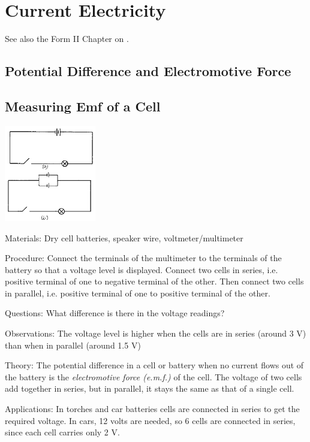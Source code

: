 \section{Current Electricity}
See also the Form II Chapter on .

\begin{multicols}{2}


\section*{Potential Difference and Electromotive Force}


\subsection{Measuring Emf of a Cell}

\begin{center}
\includegraphics[width=0.3\textwidth]{./img/source/measuring-emf.png}
\end{center}

\begin{description*}
\item[Materials:]{Dry cell batteries, speaker wire, voltmeter/multimeter}
\item[Procedure:]{Connect the terminals of the multimeter to the terminals of the battery so that a voltage level is displayed. Connect two cells in series, i.e. positive terminal of one to negative terminal of the other. Then connect two cells in parallel, i.e. positive terminal of one to positive terminal of the other.}
\item[Questions:]{What difference is there in the voltage readings?}
\item[Observations:]{The voltage level is higher when the cells are in series (around 3 V) than when in parallel (around 1.5 V)}
\item[Theory:]{The potential difference in a cell or battery when no current flows out of the battery is the \emph{electromotive force (e.m.f.)} of the cell. The voltage of two cells add together in series, but in parallel, it stays the same as that of a single cell.}
\item[Applications:]{In torches and car batteries cells are connected in series to get the required voltage. In cars, 12 volts are needed, so 6 cells are connected in series, since each cell carries only 2 V.}
\end{description*}


\end{multicols}
